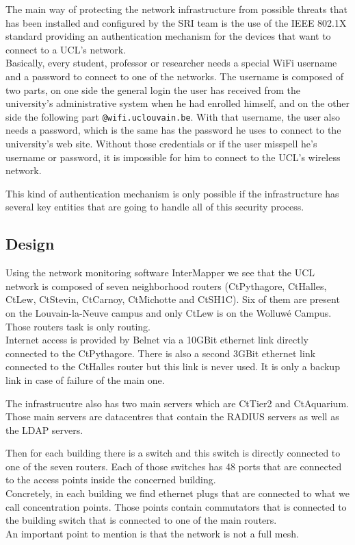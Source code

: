 The main way of protecting the network infrastructure from possible threats that has been installed and configured by the SRI team is the use of the IEEE 802.1X standard providing an authentication mechanism for the devices that want to connect to a UCL's network.\\
Basically, every student, professor or researcher needs a special WiFi username and a password to connect to one of the networks. The username is composed of two parts, on one side the general login the user has received from the university's administrative system when he had enrolled himself, and on the other side the following part \texttt{@wifi.uclouvain.be}. With that username, the user also needs a password, which is the same has the password he uses to connect to the university's web site. Without those credentials or if the user misspell he's username or password, it is impossible for him to connect to the UCL's wireless network.

This kind of authentication mechanism is only possible if the infrastructure has several key entities that are going to handle all of this security process.



\subsection{Design}
Using the network monitoring software InterMapper\cite{intermapper} we see that the UCL network is composed of seven neighborhood routers (CtPythagore, CtHalles, CtLew, CtStevin, CtCarnoy, CtMichotte and CtSH1C). Six of them are present on the Louvain-la-Neuve campus and only CtLew is on the Wolluwé Campus. Those routers task is only routing.\\

Internet access is provided by Belnet via a 10GBit ethernet link directly connected to the CtPythagore. There is also a second 3GBit ethernet link connected to the CtHalles router but this link is never used. It is only a backup link in case of failure of the main one.

The infrastrucutre also has two main servers which are CtTier2 and CtAquarium. Those main servers are datacentres that contain the RADIUS servers as well as the LDAP servers.

Then for each building there is a switch and this switch is directly connected to one of the seven routers. Each of those switches has 48 ports that are connected to the access points inside the concerned building.\\
Concretely, in each building we find ethernet plugs that are connected to what we call concentration points. Those points contain commutators that is connected to the building switch that is connected to one of the main routers.\\
An important point to mention is that the network is not a full mesh.

